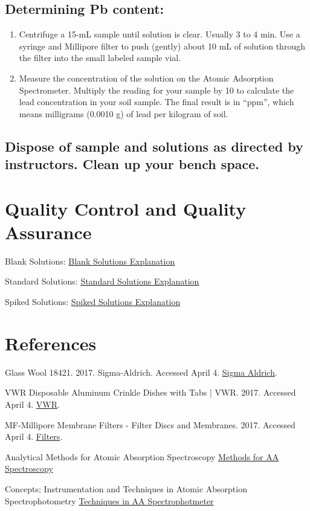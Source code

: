 \documentclass[12pt]{../SOP3_alpha}
\begin{document}
\subsection {Determining Pb content:}
  \begin{enumerate}
    \item Centrifuge a 15-mL sample until solution is clear. Usually 3 to 4 min. Use a syringe and Millipore filter to push (gently) about 10 mL of solution through the filter into the small labeled sample vial.
    \item Measure the concentration of the solution on the Atomic Adsorption Spectrometer. Multiply the reading for your sample by 10 to calculate the lead concentration in your soil sample.  The final result is in “ppm”, which means milligrams (0.0010 g) of lead per kilogram of soil.
  \end{enumerate}
  
\subsection { Dispose of sample and solutions as directed by instructors. Clean up your bench space.}



\section{Quality Control and Quality Assurance}

\NP Blank Solutions: \href{https://en.wikipedia.org/wiki/Blank_(solution)}{Blank Solutions Explanation}

\NP Standard Solutions: \href{https://en.wikipedia.org/wiki/Standard_solution}{Standard Solutions Explanation}

\NP Spiked Solutions: \href{}{Spiked Solutions Explanation}



\section{References}



\NP Glass Wool 18421. 2017. Sigma-Aldrich. Accessed April 4. \href{http://www.sigmaaldrich.com/catalog/product/sial/18421}{Sigma Aldrich}.

\NP VWR Disposable Aluminum Crinkle Dishes with Tabs | VWR. 2017. Accessed April 4. \href{https://us.vwr.com/store/catalog/product.jsp?product_id=4622693}{VWR}.

\NP MF-Millipore Membrane Filters - Filter Discs and Membranes. 2017. Accessed April 4. \href{https://www.emdmillipore.com/US/en/product/MF-Millipore%E2%84%A2-Membrane-Filters,MM_NF-C152}{Filters}.

\NP Analytical Methods for Atomic Absorption Spectroscopy \href{http://www1.lasalle.edu/~prushan/Intrumental%20Analysis_files/AA-Perkin%20Elmer%20guide%20to%20all!.pdf}{Methods for AA Spectroscopy}

\NP Concepts; Instrumentation and Techniques in Atomic Absorption Spectrophotometry \href{http://www.ufjf.br/baccan/files/2011/05/AAS-Perkin1.pdf}{Techniques in AA Spectrophotmeter}
\end{document}
